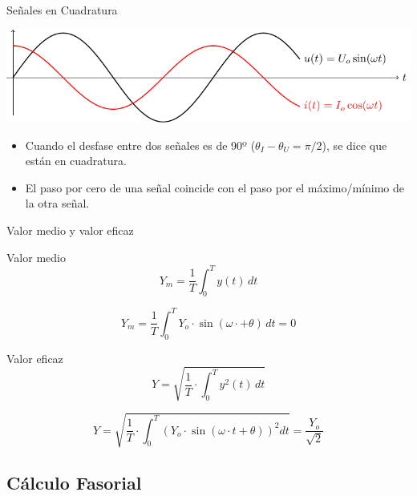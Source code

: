 \documentclass[xcolor={usenames,svgnames,dvipsnames}]{beamer}
\begin{document}
\begin{frame}[label={sec:org781daef}]{Señales en Cuadratura}
\begin{center}
\includegraphics[width=.9\linewidth]{figs/cuadratura.pdf}
\end{center}

\begin{itemize}
\item Cuando el desfase entre dos señales es de 90º (\(\theta_I - \theta_U = \pi/2\)), se dice que están en cuadratura.
\item El paso por cero de una señal coincide con el paso por el máximo/mínimo de la otra señal.
\end{itemize}
\end{frame}


\begin{frame}[label={sec:org727cc3e}]{Valor medio y valor eficaz}
\begin{block}{Valor medio}
\[
Y_m=\frac{1}{T}\int_{0}^{T}y(t)\, dt
\]

\[
Y_m=\frac{1}{T}\int_{0}^{T}Y_{o}\cdot\sin(\omega\cdot+\theta)\, dt=0
\]
\end{block}
\begin{block}{Valor eficaz}
\[
Y = \sqrt{\frac{1}{T}\cdot\int_{0}^{T}y^{2}(t)\, dt}
\]

\[
Y=\sqrt{\frac{1}{T}\cdot\int_{0}^{T}\left(Y_{o}\cdot\sin(\omega\cdot t+\theta)\right)^{2}dt}=\boxed{\frac{Y_{o}}{\sqrt{2}}}
\]
\end{block}
\end{frame}

\subsection{Cálculo Fasorial}
\label{sec:org781d5e5}
\end{document}
